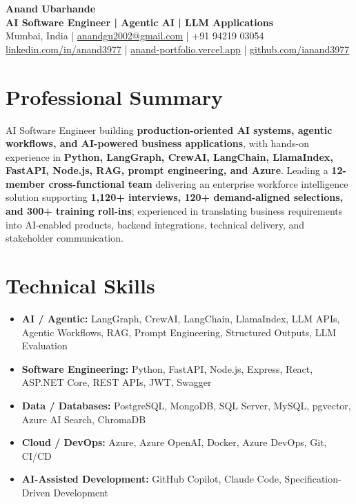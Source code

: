 \documentclass[10pt,a4paper]{article}
\begin{document}
\pagestyle{empty}
\begin{center}
{\Large\bfseries Anand Ubarhande}\\[1pt]
\normalsize\textbf{AI Software Engineer | Agentic AI | LLM Applications}\\[2pt]
\footnotesize Mumbai, India \;|\; \href{mailto:anandgu2002@gmail.com}{anandgu2002@gmail.com} \;|\; +91 94219 03054\\[-1pt]
\href{https://linkedin.com/in/anand3977/}{linkedin.com/in/anand3977} \;|\; \href{https://anand-ubarhande-portfolio.vercel.app/}{anand-portfolio.vercel.app} \;|\; \href{https://github.com/ianand3977}{github.com/ianand3977}
\end{center}
\section*{Professional Summary}
\small
AI Software Engineer building \textbf{production-oriented AI systems, agentic workflows, and AI-powered business applications}, with hands-on experience in \textbf{Python, LangGraph, CrewAI, LangChain, LlamaIndex, FastAPI, Node.js, RAG, prompt engineering, and Azure}. Leading a \textbf{12-member cross-functional team} delivering an enterprise workforce intelligence solution supporting \textbf{1,120+ interviews, 120+ demand-aligned selections, and 300+ training roll-ins}; experienced in translating business requirements into AI-enabled products, backend integrations, technical delivery, and stakeholder communication.
\section*{Technical Skills}
\begin{itemize}\small
\item \textbf{AI / Agentic:} LangGraph, CrewAI, LangChain, LlamaIndex, LLM APIs, Agentic Workflows, RAG, Prompt Engineering, Structured Outputs, LLM Evaluation
\item \textbf{Software Engineering:} Python, FastAPI, Node.js, Express, React, ASP.NET Core, REST APIs, JWT, Swagger
\item \textbf{Data / Databases:} PostgreSQL, MongoDB, SQL Server, MySQL, pgvector, Azure AI Search, ChromaDB
\item \textbf{Cloud / DevOps:} Azure, Azure OpenAI, Docker, Azure DevOps, Git, CI/CD
\item \textbf{AI-Assisted Development:} GitHub Copilot, Claude Code, Specification-Driven Development
\end{itemize}
\end{document}
